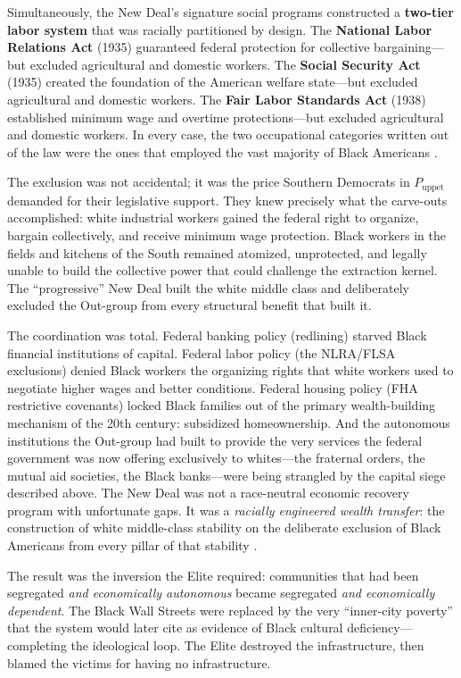 \documentclass[12pt,openany]{book}
\begin{document}
Simultaneously, the New Deal's signature social programs constructed a \textbf{two-tier labor system} that was racially partitioned by design. The \textbf{National Labor Relations Act} (1935) guaranteed federal protection for collective bargaining---but excluded agricultural and domestic workers. The \textbf{Social Security Act} (1935) created the foundation of the American welfare state---but excluded agricultural and domestic workers. The \textbf{Fair Labor Standards Act} (1938) established minimum wage and overtime protections---but excluded agricultural and domestic workers. In every case, the two occupational categories written out of the law were the ones that employed the vast majority of Black Americans \cite{katznelson_fear}.

The exclusion was not accidental; it was the price Southern Democrats in $P_{\text{uppet}}$ demanded for their legislative support. They knew precisely what the carve-outs accomplished: white industrial workers gained the federal right to organize, bargain collectively, and receive minimum wage protection. Black workers in the fields and kitchens of the South remained atomized, unprotected, and legally unable to build the collective power that could challenge the extraction kernel. The ``progressive'' New Deal built the white middle class and deliberately excluded the Out-group from every structural benefit that built it.

The coordination was total. Federal banking policy (redlining) starved Black financial institutions of capital. Federal labor policy (the NLRA/FLSA exclusions) denied Black workers the organizing rights that white workers used to negotiate higher wages and better conditions. Federal housing policy (FHA restrictive covenants) locked Black families out of the primary wealth-building mechanism of the 20th century: subsidized homeownership. And the autonomous institutions the Out-group had built to provide the very services the federal government was now offering exclusively to whites---the fraternal orders, the mutual aid societies, the Black banks---were being strangled by the capital siege described above. The New Deal was not a race-neutral economic recovery program with unfortunate gaps. It was a \textit{racially engineered wealth transfer}: the construction of white middle-class stability on the deliberate exclusion of Black Americans from every pillar of that stability \cite{katznelson_fear}.

The result was the inversion the Elite required: communities that had been segregated \textit{and economically autonomous} became segregated \textit{and economically dependent}. The Black Wall Streets were replaced by the very ``inner-city poverty'' that the system would later cite as evidence of Black cultural deficiency---completing the ideological loop. The Elite destroyed the infrastructure, then blamed the victims for having no infrastructure.
\end{document}
